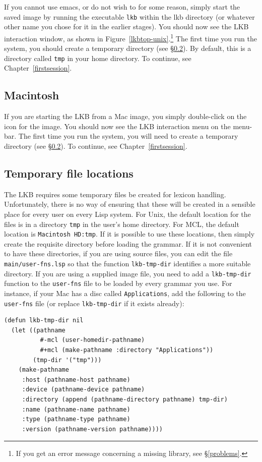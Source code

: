 \documentclass[12pt]{report}
\newcommand{\filename}[1]{{\tt #1}}
\newcommand{\functionname}[1]{{\tt #1}}
\begin{document}
If you cannot use emacs, or do not wish to for some reason,
simply start the saved image by running the executable
\filename{lkb} within the lkb directory (or whatever
other name you chose for it in the earlier stages).
You
should now see the LKB interaction window, as shown in 
Figure~\ref{lkbtop-unix}.\footnote{If 
you get an error message concerning a missing library,
see \S\ref{problems}.}
The first time you run the system, you should
create a temporary directory (see \S\ref{tempdir}).  By default, this is
a directory called \filename{tmp} in your home directory.
To continue, see Chapter~\ref{firstsession}.

\subsection{Macintosh}
\label{mcl-image}

If you are starting the LKB from a
Mac image, you simply double-click on the
icon for the image. 
You
should now see the LKB interaction menu on the menu-bar. 
The first time you run the system, you will need to
create a temporary directory (see \S\ref{tempdir}).
To continue, see Chapter~\ref{firstsession}.


\subsection{Temporary file locations}
\label{tempdir}

The LKB requires some temporary files be created for lexicon handling.  
Unfortunately, there is no way of ensuring that these will be created 
in a sensible place for every user on every Lisp system.
For
Unix, the default location for the
files is in a directory \filename{tmp} in the user's
home directory.  For MCL, the default location is \filename{Macintosh HD:tmp}.  If
it is possible to use these locations, then simply create the requisite
directory before loading the grammar.  If it is not convenient to have these
directories, if you are using source files, you can edit the file 
\filename{main/user-fns.lsp} 
so that the function \functionname{lkb-tmp-dir} identifies a more
suitable directory.  If you are using a supplied image file, you need to add a
\functionname{lkb-tmp-dir} 
function to the \filename{user-fns} file to be loaded by every grammar 
you use.  For instance,
if your Mac has a disc called \filename{Applications}, add the following
to the \filename{user-fns} file (or replace 
\functionname{lkb-tmp-dir} if it exists
already):
\begin{verbatim}
(defun lkb-tmp-dir nil 
  (let ((pathname  
          #-mcl (user-homedir-pathname)
          #+mcl (make-pathname :directory "Applications"))
        (tmp-dir '("tmp")))
    (make-pathname
     :host (pathname-host pathname) 
     :device (pathname-device pathname)
     :directory (append (pathname-directory pathname) tmp-dir)
     :name (pathname-name pathname) 
     :type (pathname-type pathname)
     :version (pathname-version pathname))))
\end{verbatim}
\end{document}

